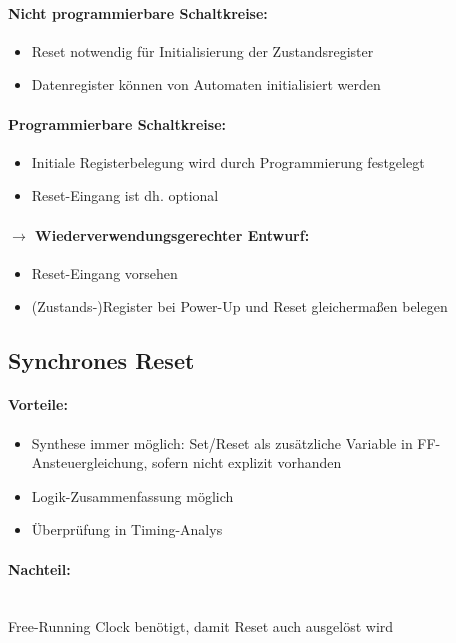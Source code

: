 	\paragraph{Nicht programmierbare Schaltkreise:}
	\begin{itemize}
		\item Reset notwendig für Initialisierung der Zustandsregister
		\item Datenregister können von Automaten initialisiert werden
	\end{itemize}
	
	\paragraph{Programmierbare Schaltkreise:}
	\begin{itemize}
		\item Initiale Registerbelegung wird durch Programmierung festgelegt
		\item Reset-Eingang ist dh. optional
	\end{itemize}
	
	\paragraph{$\rightarrow$ Wiederverwendungsgerechter Entwurf:}
	\begin{itemize}
		\item Reset-Eingang vorsehen
		\item (Zustands-)Register bei Power-Up und Reset gleichermaßen belegen
	\end{itemize}
	
\subsection{Synchrones Reset}
	\paragraph{Vorteile:}
	\begin{itemize}
		\item Synthese immer möglich: Set/Reset als zusätzliche Variable in FF-Ansteuergleichung, sofern nicht explizit vorhanden
		\item Logik-Zusammenfassung möglich
		\item Überprüfung in Timing-Analys
	\end{itemize}
	
	\paragraph{Nachteil:}\hfill\\
	Free-Running Clock benötigt, damit Reset auch ausgelöst wird
	
